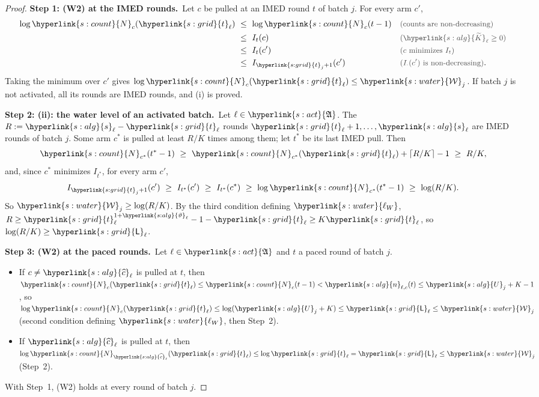 \documentclass[10pt]{article}
\newcommand{\sy}[2]{{\hyperlink{#1}{#2}}}
\newcommand{\1}{\mathbf{1}}
\newcommand{\Ng}{\sy{s:count}{N}}
\newcommand{\tl}{\sy{s:grid}{t}}
\newcommand{\Lg}{\sy{s:grid}{\mathsf L}}
\newcommand{\Ug}{\sy{s:alg}{U}}
\newcommand{\sA}{\sy{s:alg}{s}}
\newcommand{\Ld}{\sy{s:alg}{\widehat c}}
\newcommand{\Kt}{\sy{s:alg}{\widetilde K}}
\newcommand{\nt}{\sy{s:alg}{n}}
\newcommand{\thv}{\sy{s:alg}{\vartheta}}
\newcommand{\Act}{\sy{s:act}{\mathfrak A}}
\newcommand{\Lam}{\sy{s:water}{\mathcal W}}
\newcommand{\lW}{\sy{s:water}{\ell_W}}
\newcommand{\stp}[2]{\par\medskip\noindent\textbf{Step #1: #2.}\ }
\newcommand{\why}[1]{\text{\small\color{black!70}(#1)}}
\begin{document}
\begin{proof}
\stp1{(W2) at the IMED rounds}Let $c$ be pulled at an IMED round $t$ of batch $j$. For every arm $c'$,
\begin{align*}
\log\Ng_c(\tl_\ell)\ &\le\ \log\Ng_c(t-1)&&\why{counts are non-decreasing}\\
&\le\ I_t(c)&&\why{$\Kt_\ell\ge0$}\\
&\le\ I_t(c')&&\why{$c$ minimizes $I_t$}\\
&\le\ I_{\tl_j+1}(c')&&\why{$I_\cdot(c')$ is non-decreasing}.
\end{align*}
Taking the minimum over $c'$ gives $\log\Ng_c(\tl_\ell)\le\Lam_j$. If batch $j$ is not activated, all its rounds are IMED rounds, and (i) is proved.

\stp2{(ii): the water level of an activated batch}Let $\ell\in\Act$. The $R:=\sA_\ell-\tl_\ell$ rounds $\tl_\ell+1,\dots,\sA_\ell$ are IMED rounds of batch $j$. Some arm
$c^\ast$ is pulled at least $R/K$ times among them; let $t^\ast$ be its last IMED pull. Then
\[
\Ng_{c^\ast}(t^\ast-1)\ \ge\ \Ng_{c^\ast}(\tl_\ell)+\lceil R/K\rceil-1\ \ge\ R/K ,
\]
and, since $c^\ast$ minimizes $I_{t^\ast}$, for every arm $c'$,
\[
I_{\tl_j+1}(c')\ \ge\ I_{t^\ast}(c')\ \ge\ I_{t^\ast}(c^\ast)\ \ge\ \log\Ng_{c^\ast}(t^\ast-1)\ \ge\ \log(R/K).
\]
So $\Lam_j\ge\log(R/K)$. By the third condition defining $\lW$, $R\ge\tl_\ell^{1+\thv_\ell}-1-\tl_\ell\ge K\tl_\ell$, so $\log(R/K)\ge\Lg_\ell$.

\stp3{(W2) at the paced rounds}Let $\ell\in\Act$ and $t$ a paced round of batch $j$.
\begin{itemize}
\item If $c\ne\Ld_\ell$ is pulled at $t$, then $\Ng_c(\tl_\ell)\le\Ng_c(t-1)<\nt_{\ell,c}(t)\le\Ug_j+K-1$, so
$\log\Ng_c(\tl_\ell)\le\log(\Ug_j+K)\le\Lg_\ell\le\Lam_j$ (second condition defining $\lW$, then Step~2).
\item If $\Ld_\ell$ is pulled at $t$, then $\log\Ng_{\Ld_\ell}(\tl_\ell)\le\log\tl_\ell=\Lg_\ell\le\Lam_j$ (Step~2).
\end{itemize}
With Step~1, (W2) holds at every round of batch $j$.
\end{proof}

\end{document}
